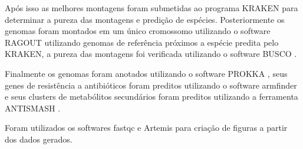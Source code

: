 Após isso as melhores montagens foram submetidas ao programa KRAKEN \cite{wood2019improved} para determinar a pureza
das montagens e predição de espécies. Posteriormente os genomas foram montados em um único cromossomo
utilizando o software RAGOUT \cite{kolmogorov2014ragout} utilizando genomas de referência próximos a espécie predita pelo KRAKEN, 
a pureza das montagens foi verificada utilizando o software BUSCO \cite{simao2015busco}.

Finalmente os genomas foram anotados utilizando o software
PROKKA \cite{seemann2014prokka} , seus genes de resistência a antibióticos foram preditos utilizando o software armfinder e seus clusters de metabólitos
secundários foram preditos utilizando a ferramenta ANTISMASH \cite{blin2021antismash}.

Foram utilizados os softwares fastqc \cite{andrews2019fastqc} e Artemis \cite{carver2012artemis} para criação de figuras a partir dos dados gerados.
